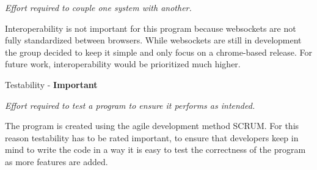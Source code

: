 \vspace{5 mm}
\noindent
\textit{Effort required to couple one system with another.}

\vspace{5 mm}
\noindent
Interoperability is not important for this program because websockets are not fully standardized between browsers. While websockets are still in development the group decided to keep it simple and only focus on a chrome-based release. For future work, interoperability would be prioritized much higher.

\vspace{5 mm}
\noindent
Testability - \textbf{Important}

\vspace{5 mm}
\noindent
\textit{Effort required to test a program to ensure it performs as intended.}

\vspace{5 mm}
\noindent
The program is created using the agile development method SCRUM. For this reason testability has to be rated important, to ensure that developers keep in mind to write the code in a way it is easy to test the correctness of the program as more features are added.